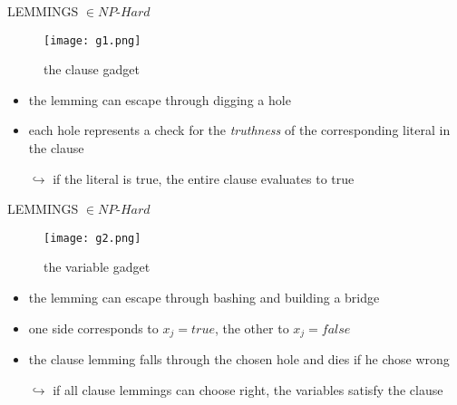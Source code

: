 \documentclass[]{beamer}
\begin{document}
\begin{frame}{LEMMINGS $\in NP \text{-} Hard$}
\begin{figure}
\texttt{[image: g1.png]}
\caption{the clause gadget \cite{p2}}
\end{figure}
\vspace{-0.5cm}
\begin{itemize}
\item the lemming can escape through digging a hole
\item each hole represents a check for the \textit{truthness} of the corresponding literal in the clause
\item[$\hookrightarrow$] if the literal is true, the entire clause evaluates to true
\end{itemize}
\end{frame}

\begin{frame}{LEMMINGS $\in NP \text{-} Hard$}
\begin{figure}
\texttt{[image: g2.png]}
\caption{the variable gadget \cite{p2}}
\end{figure}
\vspace{-0.5cm}
\begin{itemize}
\item the lemming can escape through bashing and building a bridge
\item one side corresponds to $x_j = true$, the other to $x_j = false$
\item the clause lemming falls through the chosen hole and dies if he chose wrong
\item[$\hookrightarrow$] if all clause lemmings can choose right, the variables satisfy the clause
\end{itemize}
\end{frame}
\end{document}
